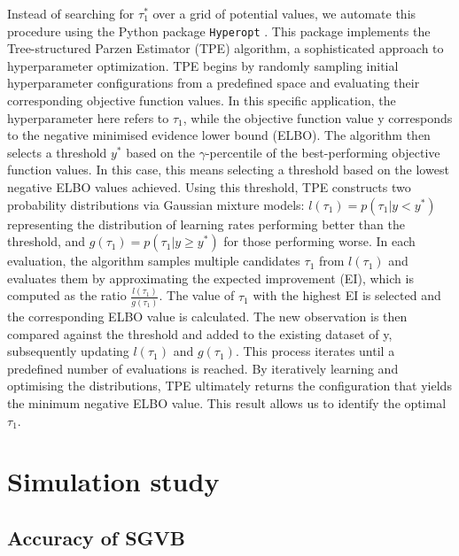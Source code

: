 \documentclass[%
 reprint,
 amsmath,amssymb,
 aps,
]{revtex4-2}
\begin{document}
Instead of searching for $\tau_1^*$ over a grid of potential values, we automate this procedure using the Python package \texttt{Hyperopt} \cite{Bergstra2013}. This package implements the Tree-structured Parzen Estimator (TPE) algorithm, a sophisticated approach to hyperparameter optimization. TPE begins by randomly sampling initial hyperparameter configurations from a predefined space and evaluating their corresponding objective function values. In this specific application, the hyperparameter here refers to $\tau_1$, while the objective function value y corresponds to the negative minimised evidence lower bound (ELBO). The algorithm then selects a threshold $y^*$ based on the $\gamma$-percentile of the best-performing objective function values. In this case, this means selecting a threshold based on the lowest negative ELBO values achieved. Using this threshold, TPE constructs two probability distributions via Gaussian mixture models: $l(\tau_1) = p(\tau_1|y < y^*)$ representing the distribution of learning rates performing better than the threshold, and $g(\tau_1) = p(\tau_1|y \geq y^*)$ for those performing worse. In each evaluation, the algorithm samples multiple candidates $\tau_1$ from $l(\tau_1)$ and evaluates them by approximating the expected improvement (EI), which is computed as the ratio $\frac{l(\tau_1)}{g(\tau_1)}$. The value of $\tau_1$ with the highest EI is selected and the corresponding ELBO value is calculated. The new observation is then compared against the threshold and added to the existing dataset of y, subsequently updating $l(\tau_1)$ and $g(\tau_1)$. This process iterates until a predefined number of evaluations is reached. By iteratively learning and optimising the distributions, TPE ultimately returns the configuration that yields the minimum negative ELBO value. This result allows us to identify the optimal $\tau_1$.



\section{Simulation study}
\label{sec:simulation}

\subsection{Accuracy of SGVB}

\end{document}

